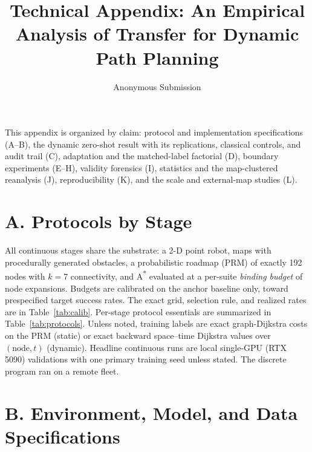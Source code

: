 \documentclass[letterpaper]{article} %
\title{Technical Appendix: An Empirical Analysis of Transfer for Dynamic Path Planning}
\author{Anonymous Submission}
\begin{document}
\maketitle
{\renewcommand{\thefootnote}{}}

This appendix is organized by claim: protocol and implementation specifications (A--B), the dynamic zero-shot result with its replications, classical controls, and audit trail (C), adaptation and the matched-label factorial (D), boundary experiments (E--H), validity forensics (I), statistics and the map-clustered reanalysis (J), reproducibility (K), and the scale and external-map studies (L).

\section{A. Protocols by Stage}

All continuous stages share the substrate: a 2-D point robot, maps with procedurally generated obstacles, a probabilistic roadmap (PRM) of exactly 192 nodes with $k{=}7$ connectivity, and A\textsuperscript{*} evaluated at a per-suite \emph{binding budget} of node expansions. Budgets are calibrated on the anchor baseline only, toward prespecified target success rates. The exact grid, selection rule, and realized rates are in Table~\ref{tab:calib}. Per-stage protocol essentials are summarized in Table~\ref{tab:protocols}. Unless noted, training labels are exact graph-Dijkstra costs on the PRM (static) or exact backward space--time Dijkstra values over $(\text{node},t)$ (dynamic). Headline continuous runs are local single-GPU (RTX 5090) validations with one primary training seed unless stated. The discrete program ran on a remote fleet.

\section{B. Environment, Model, and Data Specifications}
\end{document}
